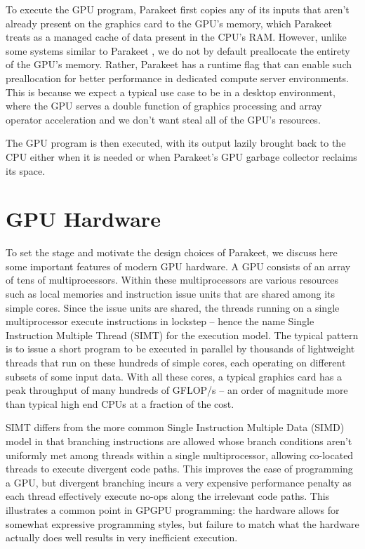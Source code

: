 \documentclass[preprint]{sigplanconf}
\begin{document}
To execute the GPU program, Parakeet first copies any of its inputs that aren't already present on the graphics card to the GPU's memory, which Parakeet treats as a managed cache of data present in the CPU's RAM.  However, unlike some systems similar to Parakeet \cite{Chaf11}, we do not by default preallocate the entirety of the GPU's memory.  Rather, Parakeet has a runtime flag that can enable such preallocation for better performance in dedicated compute server environments.  This is because we expect a typical use case to be in a desktop environment, where the GPU serves a double function of graphics processing and array operator acceleration and we don't want steal all of the GPU's resources.

The GPU program is then executed, with its output lazily brought back to the CPU either when it is needed or when Parakeet's GPU garbage collector reclaims its space. 

\section{GPU Hardware}
To set the stage and motivate the design choices of Parakeet, we discuss here some important features of modern GPU hardware.  A GPU consists of an array of tens of multiprocessors.  Within these multiprocessors are various resources such as local memories and instruction issue units that are shared among its simple cores. Since the issue units are shared, the threads running on a single multiprocessor execute instructions in lockstep -- hence the name Single Instruction Multiple Thread (SIMT) for the execution model.  The typical pattern is to issue a short program to be executed in parallel by thousands of lightweight threads that run on these hundreds of simple cores, each operating on different subsets of some input data.  With all these cores, a typical graphics card has a peak throughput of many hundreds of GFLOP/s -- an order of magnitude more than typical high end CPUs at a fraction of the cost.

SIMT differs from the more common Single Instruction Multiple Data (SIMD) model in that branching instructions are allowed whose branch conditions aren't uniformly met among threads within a single multiprocessor, allowing co-located threads to execute divergent code paths.  This improves the ease of programming a GPU, but divergent branching incurs a very expensive performance penalty as each thread effectively execute no-ops along the irrelevant code paths.  This illustrates a common point in GPGPU programming: the hardware allows for somewhat expressive programming styles, but failure to match what the hardware actually does well results in very inefficient execution.
\end{document}
